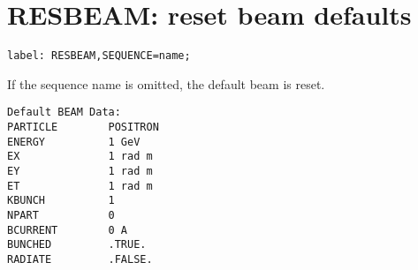 
\section{RESBEAM: reset beam defaults}
\label{sec:resbeam}

\begin{verbatim}
label: RESBEAM,SEQUENCE=name;
\end{verbatim} 

If the sequence name is omitted, the default beam is reset. 
\begin{verbatim}
Default BEAM Data:
PARTICLE        POSITRON
ENERGY          1 GeV
EX              1 rad m
EY              1 rad m
ET              1 rad m
KBUNCH          1
NPART           0
BCURRENT        0 A
BUNCHED         .TRUE.
RADIATE         .FALSE.
\end{verbatim}


